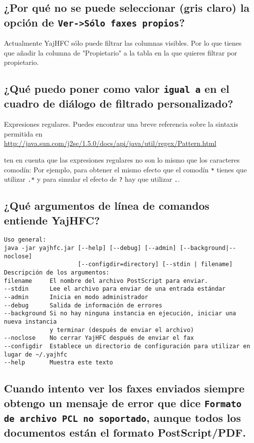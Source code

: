 \documentclass[a4paper,10pt]{scrartcl}
\begin{document}
\subsection{¿Por qué no se puede seleccionar (gris claro) la opción de \texttt{Ver->Sólo faxes propios}?}

Actualmente YajHFC sólo puede filtrar las columnas visibles. Por lo que tienes que añadir la columna de "Propietario" a la tabla en la que quieres filtrar por propietario.


\subsection{¿Qué puedo poner como valor \texttt{igual a} en el cuadro de diálogo de filtrado personalizado? }

Expresiones regulares. Puedes encontrar una breve referencia sobre la sintaxis permitida en
\url{http://java.sun.com/j2se/1.5.0/docs/api/java/util/regex/Pattern.html}

ten en cuenta que las expresiones regulares no son lo mismo que los caracteres comodín:
Por ejemplo, para obtener el mismo efecto que el comodín \verb.*. tienes que utilizar \verb#.*#
y para simular el efecto de \verb#?# hay que utilizar \verb#.#.

\subsection{¿Qué argumentos de línea de comandos entiende YajHFC?}

\begin{verbatim}
Uso general:
java -jar yajhfc.jar [--help] [--debug] [--admin] [--background|--noclose]
                     [--configdir=directory] [--stdin | filename]
Descripción de los argumentos:
filename     El nombre del archivo PostScript para enviar.
--stdin      Lee el archivo para enviar de una entrada estándar
--admin      Inicia en modo administrador
--debug      Salida de información de errores
--background Si no hay ninguna instancia en ejecución, iniciar una nueva instancia
             y terminar (después de enviar el archivo)
--noclose    No cerrar YajHFC después de enviar el fax
--configdir  Establece un directorio de configuración para utilizar en lugar de ~/.yajhfc
--help       Muestra este texto
\end{verbatim}


\subsection{ Cuando intento ver los faxes enviados siempre obtengo un mensaje de error 
   que dice \texttt{Formato de archivo PCL no soportado}, aunque todos los documentos 
   están el formato PostScript/PDF.}
\end{document}

